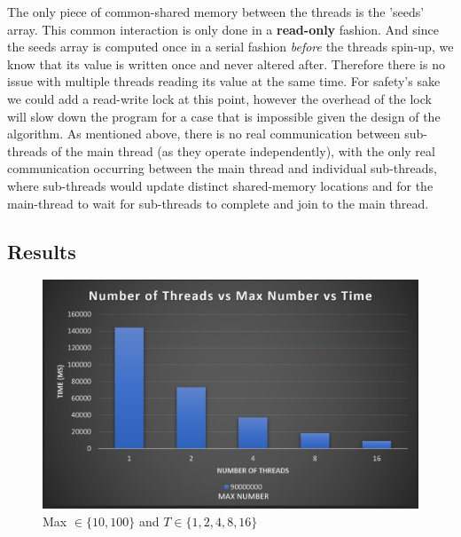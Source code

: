 The only piece of common-shared memory between the threads is the 'seeds' array. 
This common interaction is only done in a \textbf{read-only} fashion. And since the 
seeds array is computed once in a serial fashion \textit{before} the threads spin-up, 
we know that its value is written once and never altered after. Therefore there 
is no issue with multiple threads reading its value at the same time. 
For safety's sake we could add a read-write lock at this point, however the 
overhead of the lock will slow down the program for a case that is impossible 
given the design of the algorithm. As mentioned above, there is no real communication between sub-threads of the 
main thread (as they operate independently), with the only real communication 
occurring between the main thread and individual sub-threads, where sub-threads 
would update distinct shared-memory locations and for the main-thread to wait 
for sub-threads to complete and join to the main thread.

\subsection{Results}

\begin{figure}
    \centering
    \includegraphics[width=\linewidth]{Figures/maxNumVHigh.png}
    \caption{Max $\in \{10, 100\}$ and $T \in \{1, 2, 4, 8, 16\}$}
    \label{fig:maxnumvhigh}
\end{figure}

